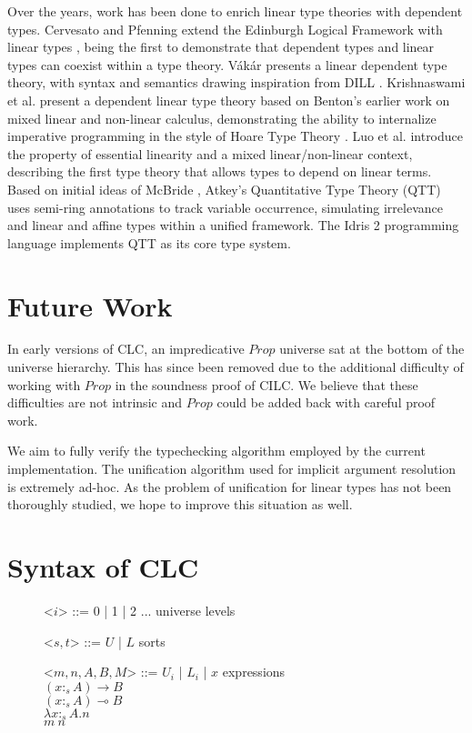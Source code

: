 \documentclass[sigplan,screen,review,anonymous]{acmart}
\newcommand{\indalt}[1][2]{\\\hspace*{-1.2em}\textbar\quad}
\begin{document}
Over the years, work has been done to enrich linear type theories with dependent types. Cervesato and Pfenning extend the Edinburgh Logical Framework with linear types \cite{lf,llf}, being the first to demonstrate that dependent types and linear types can coexist within a type theory. V\'{a}k\'{a}r \cite{vakar14} presents a linear dependent type theory, with syntax and semantics drawing inspiration from DILL \cite{dill}.  Krishnaswami et al. present a dependent linear type theory \cite{neel15} based on Benton's earlier work on mixed linear and non-linear calculus, demonstrating the ability to internalize imperative programming in the style of Hoare Type Theory \cite{htt}. Luo et al. \cite{luo} introduce the property of essential linearity and a mixed linear/non-linear context, describing the first type theory that allows types to depend on linear terms. Based on initial ideas of McBride \cite{nothing}, Atkey's Quantitative Type Theory (QTT) \cite{qtt} uses semi-ring annotations to track variable occurrence, simulating irrelevance and linear and affine types within a unified framework. The Idris 2 programming language \cite{idris2} implements QTT as its core type system.

\section{Future Work}
In early versions of CLC, an impredicative $Prop$ universe sat at the bottom of the universe hierarchy. This has since been removed due to the additional difficulty of working with $Prop$ in the soundness proof of CILC. We believe that these difficulties are not intrinsic and $Prop$ could be added back with careful proof work.

We aim to fully verify the typechecking algorithm employed by the current implementation. The unification algorithm used for implicit argument resolution is extremely ad-hoc. As the problem of unification for linear types has not been thoroughly studied, we hope to improve this situation as well.




\appendix
\appendixname

\section{Syntax of CLC}
\begin{figure}[H]
  \begin{grammar}
    <$i$> ::= 0 | 1 | 2 ... \phantom{* |} \hspace*{2.4em} universe levels

    <$s, t$> ::= $U$ | $L$ \phantom{| $x$} \hspace*{4.6em} sorts

    <$m, n, A, B, M$> ::= $U_i$ | $L_i$ | $x$ \hspace*{4em} expressions
    \indalt $(x :_s A) \rightarrow B$
    \indalt $(x :_s A) \multimap B$
    \indalt $\lambda x :_s A. n$
    \indalt $m\ n$
  \end{grammar}
  \Description{}
\end{figure}
\end{document}
